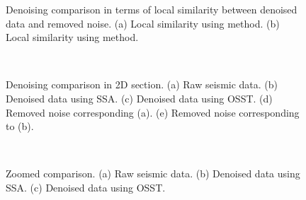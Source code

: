 \begin{figure}[htb!]
  \centering
   \caption{Denoising comparison in terms of local similarity between denoised data and removed noise. (a) Local similarity using  method. (b) Local similarity using  method.}
   \label{fig:fsimi}
\end{figure}


\begin{figure}[htb!]
  \centering
   \\
   \caption{Denoising comparison in 2D section. (a) Raw seismic data. (b) Denoised data using SSA. (c) Denoised data using OSST. (d) Removed noise corresponding (a). (e) Removed noise corresponding to (b).}
   \label{fig:field-2d}
\end{figure}

\begin{figure}[htb!]
  \centering
  \\
   \caption{Zoomed comparison. (a) Raw seismic data. (b) Denoised data using SSA. (c) Denoised data using OSST.}
   \label{fig:field-z}
\end{figure}



